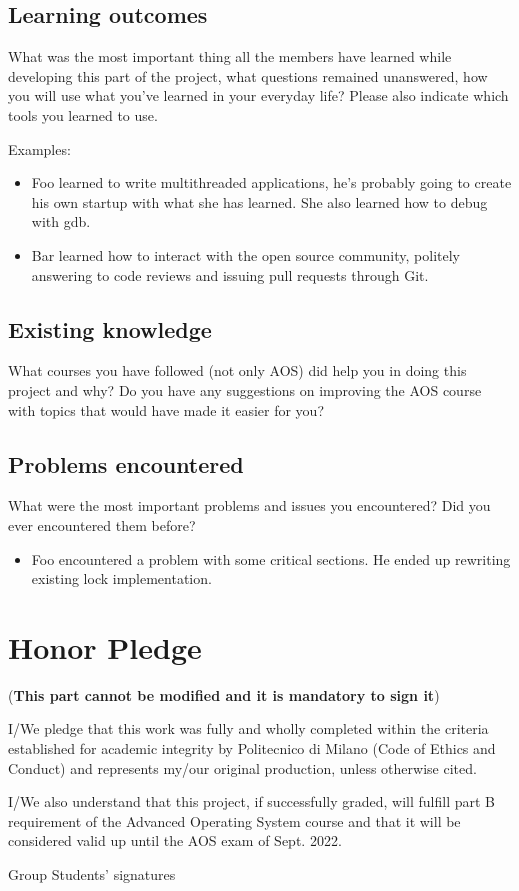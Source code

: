 \documentclass[10pt,a4]{article}
\begin{document}
\subsection{Learning outcomes}

What was the most important thing all the members have learned while
developing this part of the project, what questions remained unanswered,
how you will use what you've learned in your everyday life?
Please also indicate which tools you learned to use.

Examples:

\begin{itemize}
  \item Foo learned to write multithreaded applications, he's probably going to
        create his own startup with what she has learned. She also learned how to
        debug with gdb.
  \item Bar learned how to interact with the open source community, politely
        answering to code reviews and issuing pull requests through Git.
\end{itemize}

\subsection{Existing knowledge}
What courses you have followed (not only AOS) did help you in doing this project
and why? Do you have any suggestions on improving the AOS course with topics
that would have made it easier for you?

\subsection{Problems encountered}
What were the most important problems and issues you encountered? Did you ever
encountered them before?

\begin{itemize}
  \item Foo encountered a problem with some critical sections. He ended up
        rewriting existing lock implementation.
\end{itemize}

\section{Honor Pledge}
 (\textbf{This part cannot be modified and it is mandatory to sign it})

I/We pledge that this work was fully and wholly completed within the criteria
established for academic integrity by Politecnico di Milano (Code of Ethics and
Conduct) and represents my/our original production, unless otherwise cited.

I/We also understand that this project, if successfully graded,  will fulfill part B requirement of the
Advanced Operating System course and that it will be considered valid up until
the AOS exam of Sept. 2022.

\begin{flushright}
  Group Students' signatures
\end{flushright}
\end{document}
